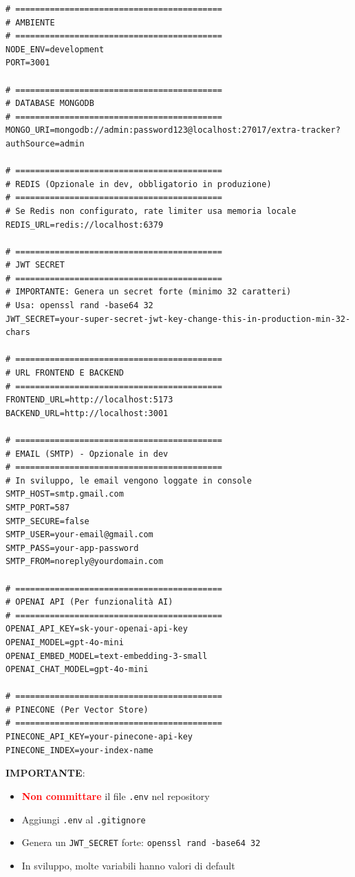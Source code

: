 \documentclass[11pt,a4paper]{article}
\newcommand{\code}[1]{\texttt{#1}}
\newcommand{\important}[1]{\textcolor{red}{\textbf{#1}}}
\begin{document}
\begin{lstlisting}[caption=server/.env - Sviluppo Locale]
# ==========================================
# AMBIENTE
# ==========================================
NODE_ENV=development
PORT=3001

# ==========================================
# DATABASE MONGODB
# ==========================================
MONGO_URI=mongodb://admin:password123@localhost:27017/extra-tracker?authSource=admin

# ==========================================
# REDIS (Opzionale in dev, obbligatorio in produzione)
# ==========================================
# Se Redis non configurato, rate limiter usa memoria locale
REDIS_URL=redis://localhost:6379

# ==========================================
# JWT SECRET
# ==========================================
# IMPORTANTE: Genera un secret forte (minimo 32 caratteri)
# Usa: openssl rand -base64 32
JWT_SECRET=your-super-secret-jwt-key-change-this-in-production-min-32-chars

# ==========================================
# URL FRONTEND E BACKEND
# ==========================================
FRONTEND_URL=http://localhost:5173
BACKEND_URL=http://localhost:3001

# ==========================================
# EMAIL (SMTP) - Opzionale in dev
# ==========================================
# In sviluppo, le email vengono loggate in console
SMTP_HOST=smtp.gmail.com
SMTP_PORT=587
SMTP_SECURE=false
SMTP_USER=your-email@gmail.com
SMTP_PASS=your-app-password
SMTP_FROM=noreply@yourdomain.com

# ==========================================
# OPENAI API (Per funzionalità AI)
# ==========================================
OPENAI_API_KEY=sk-your-openai-api-key
OPENAI_MODEL=gpt-4o-mini
OPENAI_EMBED_MODEL=text-embedding-3-small
OPENAI_CHAT_MODEL=gpt-4o-mini

# ==========================================
# PINECONE (Per Vector Store)
# ==========================================
PINECONE_API_KEY=your-pinecone-api-key
PINECONE_INDEX=your-index-name
\end{lstlisting}

\begin{importantbox}
\textbf{IMPORTANTE}: 
\begin{itemize}
    \item \important{Non committare} il file \code{.env} nel repository
    \item Aggiungi \code{.env} al \code{.gitignore}
    \item Genera un \code{JWT_SECRET} forte: \code{openssl rand -base64 32}
    \item In sviluppo, molte variabili hanno valori di default
\end{itemize}
\end{importantbox}
\end{document}
